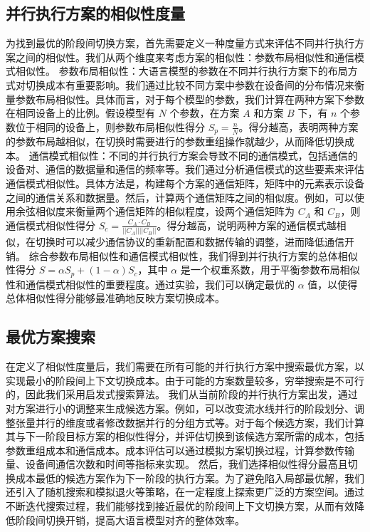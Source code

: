 \subsection{并行执行方案的相似性度量}
为找到最优的阶段间切换方案，首先需要定义一种度量方式来评估不同并行执行方案之间的相似性。我们从两个维度来考虑方案的相似性：参数布局相似性和通信模式相似性。
参数布局相似性：大语言模型的参数在不同并行执行方案下的布局方式对切换成本有重要影响。我们通过比较不同方案中参数在设备间的分布情况来衡量参数布局相似性。具体而言，对于每个模型的参数，我们计算在两种方案下参数在相同设备上的比例。假设模型有 \(N\) 个参数，在方案 \(A\) 和方案 \(B\) 下，有 \(n\) 个参数位于相同的设备上，则参数布局相似性得分 \(S_{p} = \frac{n}{N}
\)。得分越高，表明两种方案的参数布局越相似，在切换时需要进行的参数重组操作就越少，从而降低切换成本。
通信模式相似性：不同的并行执行方案会导致不同的通信模式，包括通信的设备对、通信的数据量和通信的频率等。我们通过分析通信模式的这些要素来评估通信模式相似性。具体方法是，构建每个方案的通信矩阵，矩阵中的元素表示设备之间的通信关系和数据量。然后，计算两个通信矩阵之间的相似度。例如，可以使用余弦相似度来衡量两个通信矩阵的相似程度，设两个通信矩阵为 \(C_{A}\) 和 \(C_{B}\)，则通信模式相似性得分 \(S_{c} = \frac{C_{A} \cdot C_{B}}{\vert\vert C_{A}\vert\vert \vert\vert C_{B}\vert\vert}\)。得分越高，说明两种方案的通信模式越相似，在切换时可以减少通信协议的重新配置和数据传输的调整，进而降低通信开销。
综合参数布局相似性和通信模式相似性，我们得到并行执行方案的总体相似性得分 \(S = \alpha S_{p} + (1 - \alpha) S_{c}\)，其中 \(\alpha\) 是一个权重系数，用于平衡参数布局相似性和通信模式相似性的重要程度。通过实验，我们可以确定最优的 \(\alpha\) 值，以使得总体相似性得分能够最准确地反映方案切换成本。
\subsection{最优方案搜索}
在定义了相似性度量后，我们需要在所有可能的并行执行方案中搜索最优方案，以实现最小的阶段间上下文切换成本。由于可能的方案数量较多，穷举搜索是不可行的，因此我们采用启发式搜索算法。
我们从当前阶段的并行执行方案出发，通过对方案进行小的调整来生成候选方案。例如，可以改变流水线并行的阶段划分、调整张量并行的维度或者修改数据并行的分组方式等。对于每个候选方案，我们计算其与下一阶段目标方案的相似性得分，并评估切换到该候选方案所需的成本，包括参数重组成本和通信成本。成本评估可以通过模拟方案切换过程，计算参数传输量、设备间通信次数和时间等指标来实现。
然后，我们选择相似性得分最高且切换成本最低的候选方案作为下一阶段的执行方案。为了避免陷入局部最优解，我们还引入了随机搜索和模拟退火等策略，在一定程度上探索更广泛的方案空间。通过不断迭代搜索过程，我们能够找到接近最优的阶段间上下文切换方案，从而有效降低阶段间切换开销，提高大语言模型对齐的整体效率。
